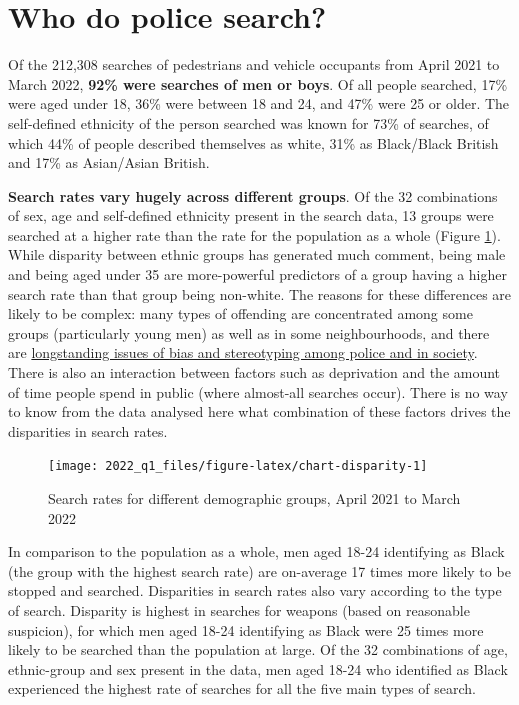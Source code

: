 \documentclass[
  a4paper,
  twoside, 11pt]{article}
\begin{document}
\hypertarget{who-do-police-search}{%
\section{Who do police search?}\label{who-do-police-search}}

Of the 212,308 searches of pedestrians and vehicle occupants from April 2021 to March 2022, \textbf{92\% were searches of men or boys}. Of all people searched, 17\% were aged under 18, 36\% were between 18 and 24, and 47\% were 25 or older. The self-defined ethnicity of the person searched was known for 73\% of searches, of which 44\% of people described themselves as white, 31\% as Black/Black British and 17\% as Asian/Asian British.

\textbf{Search rates vary hugely across different groups}. Of the 32 combinations of sex, age and self-defined ethnicity present in the search data, 13 groups were searched at a higher rate than the rate for the population as a whole (Figure \ref{fig:chart-disparity}). While disparity between ethnic groups has generated much comment, being male and being aged under 35 are more-powerful predictors of a group having a higher search rate than that group being non-white. The reasons for these differences are likely to be complex: many types of offending are concentrated among some groups (particularly young men) as well as in some neighbourhoods, and there are \href{https://www.bbc.co.uk/news/uk-47300343}{longstanding issues of bias and stereotyping among police and in society}. There is also an interaction between factors such as deprivation and the amount of time people spend in public (where almost-all searches occur). There is no way to know from the data analysed here what combination of these factors drives the disparities in search rates.



\begin{figure}[tb]

{\centering \texttt{[image: 2022\_q1\_files/figure-latex/chart-disparity-1]} 

}

\caption{Search rates for different demographic groups, April 2021 to March 2022}\label{fig:chart-disparity}
\end{figure}

In comparison to the population as a whole, men aged 18-24 identifying as Black (the group with the highest search rate) are on-average 17 times more likely to be stopped and searched. Disparities in search rates also vary according to the type of search. Disparity is highest in searches for weapons (based on reasonable suspicion), for which men aged 18-24 identifying as Black were 25 times more likely to be searched than the population at large. Of the 32 combinations of age, ethnic-group and sex present in the data, men aged 18-24 who identified as Black experienced the highest rate of searches for all the five main types of search.
\end{document}
